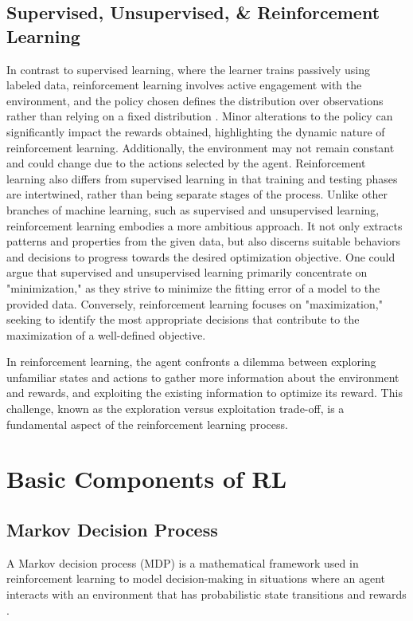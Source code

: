 \subsection{Supervised, Unsupervised, \& Reinforcement Learning}
In contrast to supervised learning, where the learner trains passively using labeled data, reinforcement learning involves active engagement with the environment, and the policy chosen defines the distribution over observations rather than relying on a fixed distribution \cite{jordan2015}. Minor alterations to the policy can significantly impact the rewards obtained, highlighting the dynamic nature of reinforcement learning. Additionally, the environment may not remain constant and could change due to the actions selected by the agent. Reinforcement learning also differs from supervised learning in that training and testing phases are intertwined, rather than being separate stages of the process. 
Unlike other branches of machine learning, such as supervised and unsupervised learning, reinforcement learning embodies a more ambitious approach. It not only extracts patterns and properties from the given data, but also discerns suitable behaviors and decisions to progress towards the desired optimization objective. One could argue that supervised and unsupervised learning primarily concentrate on "minimization," as they strive to minimize the fitting error of a model to the provided data. Conversely, reinforcement learning focuses on "maximization," seeking to identify the most appropriate decisions that contribute to the maximization of a well-defined objective.

In reinforcement learning, the agent confronts a dilemma between exploring unfamiliar states and actions to gather more information about the environment and rewards, and exploiting the existing information to optimize its reward. This challenge, known as the exploration versus exploitation trade-off, is a fundamental aspect of the reinforcement learning process.

\section{Basic Components of RL}
\subsection{Markov Decision Process}
A Markov decision process (MDP) is a mathematical framework used in reinforcement learning to model decision-making in situations where an agent interacts with an environment that has probabilistic state transitions and rewards \cite{Markov}. 

